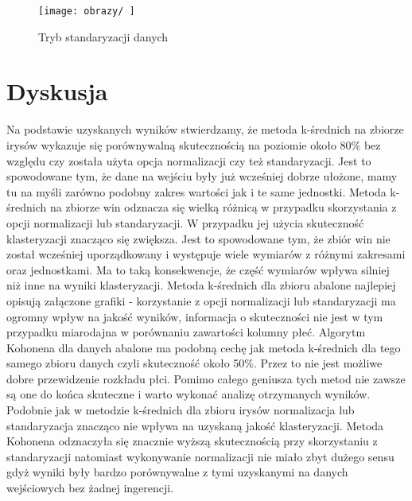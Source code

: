 \documentclass{classrep}
\begin{document}
{{{{\begin{figure}[!htbp]
\centering
\texttt{[image: obrazy/ ]}
\caption{Tryb standaryzacji danych}
\end{figure}
\FloatBarrier \fi
}

}

}

\section{Dyskusja}
{
Na podstawie uzyskanych wyników stwierdzamy, że metoda k-średnich na zbiorze irysów wykazuje się porównywalną
skutecznością na poziomie około 80\% bez względu czy została użyta opcja normalizacji czy też standaryzacji.
Jest to spowodowane tym, że dane na wejściu były już wcześniej dobrze ułożone, mamy tu na myśli zarówno podobny
zakres wartości jak i te same jednostki. Metoda k-średnich na zbiorze win odznacza się wielką różnicą w przypadku
skorzystania z opcji normalizacji lub standaryzacji. W przypadku jej użycia skuteczność klasteryzacji znacząco się
zwiększa. Jest to spowodowane tym, że zbiór win nie został wcześniej uporządkowany i występuje wiele wymiarów z
różnymi zakresami oraz jednostkami. Ma to taką konsekwencje, że część wymiarów wpływa silniej niż inne na wyniki
klasteryzacji. Metoda k-średnich dla zbioru abalone najlepiej opisują załączone grafiki - korzystanie z opcji
normalizacji lub standaryzacji ma ogromny wpływ na jakość wyników, informacja o skuteczności nie jest w tym przypadku
miarodajna w porównaniu zawartości kolumny płeć. Algorytm Kohonena dla danych abalone ma podobną cechę jak metoda
k-średnich dla tego samego zbioru danych czyli skuteczność około 50\%. Przez to nie jest możliwe dobre przewidzenie
rozkładu płci. Pomimo całego geniusza tych metod nie zawsze są one do końca skuteczne i warto wykonać analizę
otrzymanych wyników. Podobnie jak w metodzie k-średnich dla zbioru irysów normalizacja lub standaryzacja znacząco
nie wpływa na uzyskaną jakość klasteryzacji. Metoda Kohonena odznaczyła się znacznie wyższą skutecznością przy
skorzystaniu z standaryzacji natomiast wykonywanie normalizacji nie miało zbyt dużego sensu gdyż wyniki były bardzo
porównywalne z tymi uzyskanymi na danych wejściowych bez żadnej ingerencji.

}

}
\end{document}
